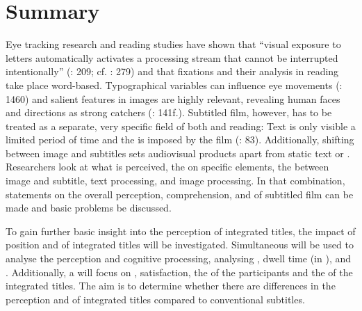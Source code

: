 \section{Summary}\label{sec:6.5}

Eye tracking research and reading studies have shown that “visual exposure to letters automatically activates a processing stream that cannot be interrupted intentionally” (\citealt{Hvelplund2014}: 209; cf. \citealt{Valdes2005}: 279) and that fixations and their analysis in reading take place word-based. Typographical variables can influence eye movements (\citealt{rayner2009}: 1460) and salient features in images are highly relevant, revealing human faces and  directions as strong  catchers (\citealt{Lautenbacher2012}: 141f.). Subtitled film, however, has to be treated as a separate, very specific field of both  and reading: Text is only visible a limited period of time and the  is imposed by the film (\citealt{schotter2012}: 83). Additionally,  shifting between image and subtitles sets audiovisual products apart from static text or . Researchers look at what is perceived, the  on specific elements, the  between image and subtitle, text processing, and image processing. In that combination, statements on the overall perception, comprehension, and  of subtitled film can be made and basic  problems be discussed.

To gain further basic insight into the perception of integrated titles, the impact of position and  of integrated titles will be investigated. Simultaneous  will be used to analyse the perception and cognitive processing, analysing , dwell time (in ), and . Additionally, a  will focus on , satisfaction, the  of the participants and the  of the integrated titles. The aim is to determine whether there are differences in the perception and  of integrated titles compared to conventional subtitles.

